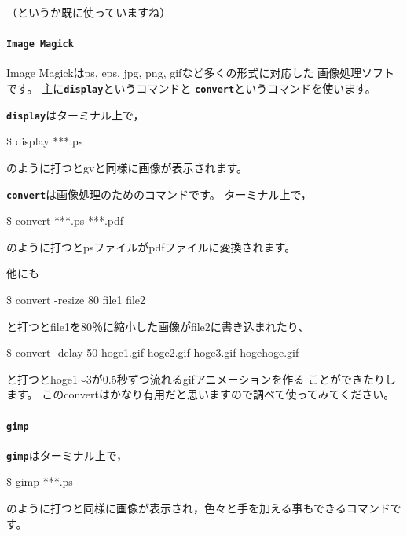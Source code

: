 \documentclass[a4j]{ujarticle} %
\newenvironment{terminal}{%
  \begin{center}
   \begin{minipage}{.8\textwidth}
    \setlength{\FrameSep}{.5\FrameSep}%
    \begin{framed}\ttfamily\small%
     \setlength\baselineskip{.85\baselineskip}%
}{%
    \end{framed}
   \end{minipage}
  \end{center}%
}
\begin{document}
（というか既に使っていますね）

\paragraph{{\tt\bf Image Magick}}
Image Magickはps, eps, jpg, png, gifなど多くの形式に対応した
画像処理ソフトです。
主に{\tt\bf display}というコマンドと
{\tt\bf convert}というコマンドを使います。

{\tt\bf display}はターミナル上で，
\begin{terminal}
\$ display ***.ps
\end{terminal}
のように打つとgvと同様に画像が表示されます。

{\tt\bf convert}は画像処理のためのコマンドです。
ターミナル上で，
\begin{terminal}
\$ convert ***.ps ***.pdf
\end{terminal}
のように打つとpsファイルがpdfファイルに変換されます。

他にも
\begin{terminal}
\$ convert -resize 80 file1 file2
\end{terminal}
と打つとfile1を80％に縮小した画像がfile2に書き込まれたり、
\begin{terminal}
\$ convert -delay 50 hoge1.gif hoge2.gif hoge3.gif hogehoge.gif
\end{terminal}
と打つとhoge1$\sim$3が0.5秒ずつ流れるgifアニメーションを作る
ことができたりします。
このconvertはかなり有用だと思いますので調べて使ってみてください。

\paragraph{{\tt\bf gimp}}
{\tt\bf gimp}はターミナル上で，
\begin{terminal}
\$ gimp ***.ps
\end{terminal}
のように打つと同様に画像が表示され，色々と手を加える事もできるコマンドです。


\newpage
\end{document}
